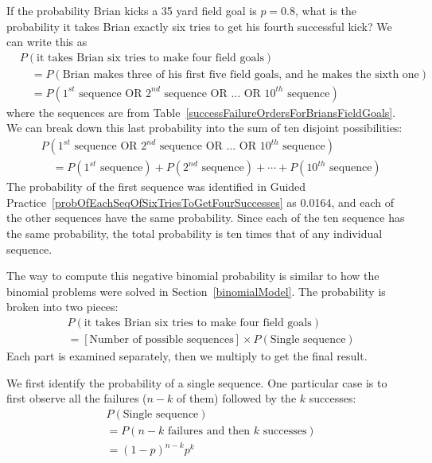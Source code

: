 If the probability Brian kicks a 35 yard field goal is $p=0.8$, what is the probability it takes Brian exactly six tries to get his fourth successful kick? We can write this as
{\small\begin{align*}
&P(\text{it takes Brian six tries to make four field goals}) \\
& \quad = P(\text{Brian makes three of his first five field goals, and he makes the sixth one}) \\
& \quad = P(\text{$1^{st}$ sequence OR $2^{nd}$ sequence OR ... OR $10^{th}$ sequence})
\end{align*}
}where the sequences are from Table~\ref{successFailureOrdersForBriansFieldGoals}. We can break down this last probability into the sum of ten disjoint possibilities:
{\small\begin{align*}
&P(\text{$1^{st}$ sequence OR $2^{nd}$ sequence OR ... OR $10^{th}$ sequence}) \\
&\quad = P(\text{$1^{st}$ sequence}) + P(\text{$2^{nd}$ sequence}) + \cdots + P(\text{$10^{th}$ sequence})
\end{align*}
}The probability of the first sequence was identified in Guided Practice~\ref{probOfEachSeqOfSixTriesToGetFourSuccesses} as 0.0164, and each of the other sequences have the same probability. Since each of the ten sequence has the same probability, the total probability is ten times that of any individual sequence.

The way to compute this negative binomial probability is similar to how the binomial problems were solved in Section~\ref{binomialModel}. The probability is broken into two pieces:
\begin{align*}
&P(\text{it takes Brian six tries to make four field goals}) \\
&= [\text{Number of possible sequences}] \times P(\text{Single sequence})
\end{align*}
Each part is examined separately, then we multiply to get the final result.

We first identify the probability of a single sequence. One particular case is to first observe all the failures ($n-k$ of them) followed by the $k$ successes:
\begin{align*}
&P(\text{Single sequence}) \\
&= P(\text{$n-k$ failures and then $k$ successes}) \\
&= (1-p)^{n-k} p^{k}
\end{align*}


